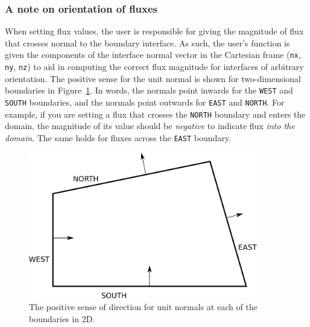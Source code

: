 \subsubsection*{A note on orientation of fluxes}
When setting flux values, the user is responsible for giving the magnitude
of flux that crosses normal to the boundary interface.
As such, the user's function is given the components of the
interface normal vector in the Cartesian frame
(\texttt{nx}, \texttt{ny}, \texttt{nz}) to aid in computing the
correct flux magnitude for interfaces of arbitrary orientation.
The positive sense for the unit normal is shown for two-dimensional
boundaries in Figure~\ref{fig:boundary-normals}.
In words, the normals point inwards for the \texttt{WEST} and \texttt{SOUTH}
boundaries, and the normals point outwards for \texttt{EAST} and \texttt{NORTH}.
For example, if you are setting a flux that crosses the \texttt{NORTH} boundary
and enters the domain, the magnitude of its value should be \emph{negative} to indicate
flux \emph{into the domain}.
The same holds for fluxes across the \texttt{EAST} boundary.

\begin{figure}[htbp]
\begin{center}
\includegraphics[width=10cm]{figs/boundary-normals.pdf}
\end{center}
\caption{The positive sense of direction for unit normals at each of the boundaries in 2D.}
\label{fig:boundary-normals}
\end{figure}




